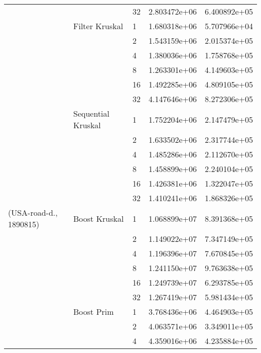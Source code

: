 \begin{tabular}{lllrr}
                       &                    & 32 &  2.803472e+06 &  6.400892e+05 \\
                       & Filter Kruskal & 1  &  1.680318e+06 &  5.707966e+04 \\
                       &                    & 2  &  1.543159e+06 &  2.015374e+05 \\
                       &                    & 4  &  1.380036e+06 &  1.758768e+05 \\
                       &                    & 8  &  1.263301e+06 &  4.149603e+05 \\
                       &                    & 16 &  1.492285e+06 &  4.809105e+05 \\
                       &                    & 32 &  4.147646e+06 &  8.272306e+05 \\
                       & Sequential Kruskal & 1  &  1.752204e+06 &  2.147479e+05 \\
                       &                    & 2  &  1.633502e+06 &  2.317744e+05 \\
                       &                    & 4  &  1.485286e+06 &  2.112670e+05 \\
                       &                    & 8  &  1.458899e+06 &  2.240104e+05 \\
                       &                    & 16 &  1.426381e+06 &  1.322047e+05 \\
                       &                    & 32 &  1.410241e+06 &  1.868326e+05 \\
(USA-road-d., 1890815) & Boost Kruskal & 1  &  1.068899e+07 &  8.391368e+05 \\
                       &                    & 2  &  1.149022e+07 &  7.347149e+05 \\
                       &                    & 4  &  1.196396e+07 &  7.670845e+05 \\
                       &                    & 8  &  1.241150e+07 &  9.763638e+05 \\
                       &                    & 16 &  1.249739e+07 &  6.293785e+05 \\
                       &                    & 32 &  1.267419e+07 &  5.981434e+05 \\
                       & Boost Prim & 1  &  3.768436e+06 &  4.464903e+05 \\
                       &                    & 2  &  4.063571e+06 &  3.349011e+05 \\
                       &                    & 4  &  4.359016e+06 &  4.235884e+05 \\

\end{tabular}
